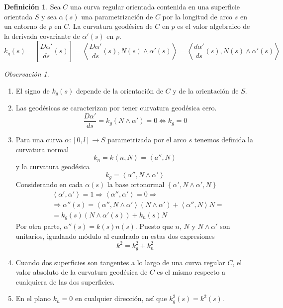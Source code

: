 \documentclass{report}
\theoremstyle{remark}
\newtheorem*{remark}{Observación}
\theoremstyle{remark}
\theoremstyle{definition}
\newtheorem{definition}{Definición}[chapter]
\theoremstyle{definition}
\theoremstyle{definition}
\begin{document}
\begin{definition}
    Sea $C$ una curva regular orientada contenida en una superficie orientada $S$ y sea $\alpha(s)$ una parametrización de $C$ por la longitud de arco $s$ en un entorno de $p$ en $C$.
    La curvatura geodésica de $C$ en $p$ es el valor algebraico de la derivada covariante de $\alpha'(s)$ en $p$.
    $$k_g(s) = \left[ \frac{D\alpha'}{ds}(s) \right] = \left\langle \frac{D\alpha'}{ds}(s), N(s) \land \alpha'(s) \right\rangle = \left\langle \frac{d\alpha'}{ds}(s), N(s) \land \alpha'(s) \right\rangle$$
\end{definition}

\begin{remark}
    \hfill
    \begin{enumerate}
        \item El signo de $k_g(s)$ depende de la orientación de $C$ y de la orientación de $S$.
        \item Las geodésicas se caracterizan por tener curvatura geodésica cero.
              $$\frac{D\alpha'}{ds} = k_g(N \land \alpha') = 0 \Leftrightarrow k_g = 0$$
        \item Para una curva $\alpha : [0, l] \to S$ parametrizada por el arco $s$ tenemos definida la curvatura normal
              $$k_n = k \left\langle n, N \right\rangle = \left\langle a'', N \right\rangle$$
              y la curvatura geodésica
              $$k_g = \left\langle \alpha'', N \land \alpha' \right\rangle$$
              Considerando en cada $\alpha(s)$ la base ortonormal $\left\{ \alpha', N \land \alpha', N \right\}$
              \begin{align*}
                   & \left\langle \alpha', \alpha' \right\rangle = 1 \Rightarrow \left\langle \alpha'', \alpha' \right\rangle = 0 \Rightarrow                      \\
                   & \Rightarrow \alpha''(s) = \left\langle \alpha'', N \land \alpha' \right\rangle (N \land \alpha') + \left\langle \alpha'', N \right\rangle N = \\
                   & = k_g(s) (N \land \alpha'(s)) + k_n(s)N
              \end{align*}
              Por otra parte, $\alpha''(s) = k(s)n(s)$.
              Puesto que $n$, $N$ y $N \land \alpha'$ son unitarios, igualando módulo al cuadrado en estas dos expresiones
              $$k^2 = k_g^2 + k_n^2$$
        \item Cuando dos superficies son tangentes a lo largo de una curva regular $C$, el valor absoluto de la curvatura geodésica de $C$ es el mismo respecto a cualquiera de las dos superficies.
        \item En el plano $k_n = 0$ en cualquier dirección, así que $k_g^2(s) = k^2(s)$.
    \end{enumerate}
\end{remark}
\end{document}
